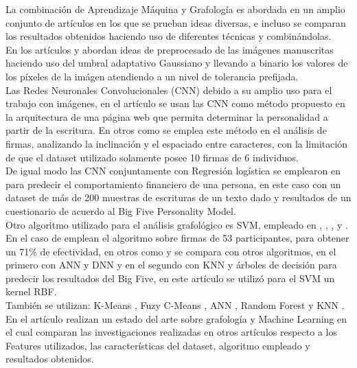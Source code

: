 \documentclass[10pt, a4paper]{article}
\begin{document}
        La combinaci\'on de Aprendizaje M\'aquina y Grafolog\'ia es abordada en un amplio conjunto de art\'iculos en los que se prueban ideas diversas, e incluso se comparan los resultados obtenidos haciendo uso de
        diferentes t\'ecnicas y combin\'andolas.\\ 

        En los art\'iculos \cite{1} y \cite{2} abordan ideas de preprocesado de las im\'agenes manuscritas haciendo uso del umbral adaptativo Gaussiano y llevando a binario los valores de los p\'ixeles de la im\'agen atendiendo a un
        nivel de tolerancia prefijada.\\ 

        Las Redes Neuronales Convolucionales (CNN) debido a su amplio uso para el trabajo con im\'agenes, en el art\'iculo \cite{1} se usan las CNN como m\'etodo propuesto en la arquitectura de una p\'agina web que permita determinar la personalidad 
        a partir de la escritura. En otros como \cite{3} se emplea este m\'etodo en el an\'alisis de firmas, analizando la inclinaci\'on y el espaciado entre caracteres, con la limitaci\'on de que el dataset utilizado solamente posee 10 firmas de 6 individuos. \\ 

        De igual modo las CNN conjuntamente con Regresi\'on log\'istica se emplearon en \cite{4} para predecir el comportamiento financiero de una persona, en este caso con un dataset de más de 200 muestras de escrituras de un texto dado y resultados de un cuestionario de acuerdo al Big Five Personality Model.\\ 

        Otro algoritmo utilizado para el an\'alisis grafol\'ogico es SVM, empleado en \cite{2}, \cite{5}, \cite{6}, \cite{7} y \cite{8}. En el caso de \cite{6} emplean el algoritmo sobre firmas de 53 participantes, para obtener un 71\% de efectividad, 
        en otros como \cite{5} y \cite{8} se compara con otros algoritmos, en el primero con ANN y DNN y en el segundo con KNN y \'arboles de decisi\'on para predecir los resultados del Big Five, en este art\'iculo se utiliz\'o para el SVM un kernel RBF.\\ 

        Tambi\'en se utilizan: K-Means \cite{9}, Fuzy C-Means \cite{10}, ANN \cite{11,5,12,9}, Random Forest \cite{13, 14} y KNN \cite{14,9,8}.\\

        En el art\'iculo \cite{18} realizan un estado del arte sobre grafolog\'ia y Machine Learning en el cual comparan las investigaciones realizadas en 
        otros art\'iculos respecto a los Features utilizados, las caracter\'isticas del dataset, algoritmo empleado y resultados obtenidos.
\end{document}
